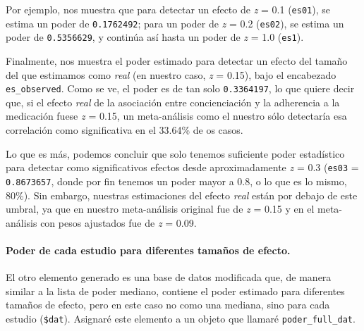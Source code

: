 \documentclass[
  bookmarksnumbered]{article}
\newenvironment{Shaded}{\begin{snugshade}}{\end{snugshade}}
\newcommand{\NormalTok}[1]{\textcolor[rgb]{0.12,0.11,0.11}{#1}}
\newcommand{\OtherTok}[1]{\textcolor[rgb]{0.00,0.43,0.16}{#1}}
\newcommand{\SpecialCharTok}[1]{\textcolor[rgb]{0.24,0.68,0.91}{#1}}
\begin{document}
Por ejemplo, nos muestra que para detectar un efecto de \emph{z} = 0.1 (\texttt{es01}), se estima un poder de \texttt{0.1762492}; para un poder de \emph{z} = 0.2 (\texttt{es02}), se estima un poder de \texttt{0.5356629}, y continúa así hasta un poder de \emph{z} = 1.0 (\texttt{es1}).

Finalmente, nos muestra el poder estimado para detectar un efecto del tamaño del que estimamos como \emph{real} (en nuestro caso, \emph{z} = 0.15), bajo el encabezado \texttt{es\_observed}. Como se ve, el poder es de tan solo \texttt{0.3364197}, lo que quiere decir que, si el efecto \emph{real} de la asociación entre concienciación y la adherencia a la medicación fuese \emph{z} = 0.15, un meta-análisis como el nuestro sólo detectaría esa correlación como significativa en el 33.64\% de os casos.

Lo que es más, podemos concluir que solo tenemos suficiente poder estadístico para detectar como significativos efectos desde aproximadamente \emph{z} = 0.3 (\texttt{es03} = \texttt{0.8673657}, donde por fin tenemos un poder mayor a 0.8, o lo que es lo mismo, 80\%). Sin embargo, nuestras estimaciones del efecto \emph{real} están por debajo de este umbral, ya que en nuestro meta-análisis original fue de \emph{z} = 0.15 y en el meta-análisis con pesos ajustados fue de \emph{z} = 0.09.

\hypertarget{poder-de-cada-estudio-para-diferentes-tamauxf1os-de-efecto.}{%
\paragraph{Poder de cada estudio para diferentes tamaños de efecto.}\label{poder-de-cada-estudio-para-diferentes-tamauxf1os-de-efecto.}}

El otro elemento generado es una base de datos modificada que, de manera similar a la lista de poder mediano, contiene el poder estimado para diferentes tamaños de efecto, pero en este caso no como una mediana, sino para cada estudio (\texttt{\$dat}). Asignaré este elemento a un objeto que llamaré \texttt{poder\_full\_dat}.

\begin{Shaded}
\end{Shaded}
\end{document}
